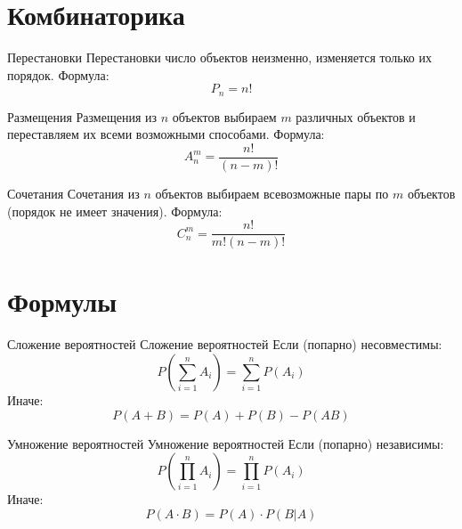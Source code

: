 \documentclass[12pt]{article}
\begin{document}
\tableofcontents
\newpage
\printindex

\newpage
\section{Комбинаторика}
\begin{definition}
    {Перестановки}
    {Перестановки}
    число объектов неизменно, изменяется только их порядок. Формула:
    \begin{displaymath}
        P_{n}=n!
    \end{displaymath}
\end{definition}

\begin{definition}
    {Размещения}
    {Размещения}
    из $n$ объектов выбираем $m$ различных объектов и переставляем их
    всеми возможными способами. Формула:
    \begin{displaymath}
        A_{n}^{m}=\frac{n!}{(n-m)!}
    \end{displaymath}
\end{definition}

\begin{definition}
    {Сочетания}
    {Сочетания}
    из $n$ объектов выбираем всевозможные пары по $m$ объектов (порядок
    не имеет значения). Формула:
    \begin{displaymath}
        C_{n}^{m}=\frac{n!}{m!(n-m)!}
    \end{displaymath}
\end{definition}

\newpage
\section{Формулы}
\begin{theorem}
    {Сложение вероятностей}
    {Сложение вероятностей}
    {}
    Если (попарно) несовместимы:
    \begin{displaymath}
        P\left(\sum\limits_{i=1}^{n}A_{i}\right)=\sum\limits_{i=1}^{n}P\left(A_{i}\right)
    \end{displaymath}
    Иначе:
    \begin{displaymath}
        P(A+B)=P(A)+P(B)-P(AB)
    \end{displaymath}
\end{theorem}

\begin{theorem}
    {Умножение вероятностей}
    {Умножение вероятностей}
    {}
    Если (попарно) независимы:
    \begin{displaymath}
        P\left(\prod\limits_{i=1}^{n}A_{i}\right)=\prod\limits_{i=1}^{n}P\left(A_{i}\right)
    \end{displaymath}
    Иначе:
    \begin{displaymath}
        P(A\cdot B)=P(A)\cdot P(B|A)
    \end{displaymath}
\end{theorem}
\end{document}
